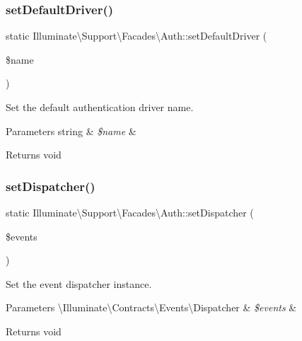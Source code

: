 \subsubsection{\texorpdfstring{set\+Default\+Driver()}{setDefaultDriver()}}
{\footnotesize\ttfamily static Illuminate\textbackslash{}\+Support\textbackslash{}\+Facades\textbackslash{}\+Auth\+::set\+Default\+Driver (\begin{DoxyParamCaption}\item[{}]{\$name }\end{DoxyParamCaption})\hspace{0.3cm}{\ttfamily [static]}}

Set the default authentication driver name.


\begin{DoxyParams}[1]{Parameters}
string & {\em \$name} & \\
\hline
\end{DoxyParams}
\begin{DoxyReturn}{Returns}
void 
\end{DoxyReturn}
\mbox{\label{class_illuminate_1_1_support_1_1_facades_1_1_auth_ac8c611f42d922a4825347a7f92910922}} 
\subsubsection{\texorpdfstring{set\+Dispatcher()}{setDispatcher()}}
{\footnotesize\ttfamily static Illuminate\textbackslash{}\+Support\textbackslash{}\+Facades\textbackslash{}\+Auth\+::set\+Dispatcher (\begin{DoxyParamCaption}\item[{}]{\$events }\end{DoxyParamCaption})\hspace{0.3cm}{\ttfamily [static]}}

Set the event dispatcher instance.


\begin{DoxyParams}[1]{Parameters}
\textbackslash{}\+Illuminate\textbackslash{}\+Contracts\textbackslash{}\+Events\textbackslash{}\+Dispatcher & {\em \$events} & \\
\hline
\end{DoxyParams}
\begin{DoxyReturn}{Returns}
void 
\end{DoxyReturn}
\mbox{\label{class_illuminate_1_1_support_1_1_facades_1_1_auth_a8c2ecd65aa1a1607a35519b566bd66da}} 
